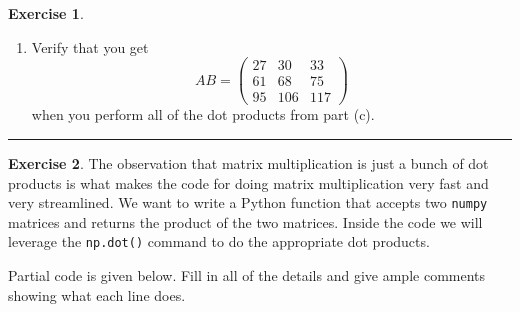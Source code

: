 \documentclass[
]{book}
\theoremstyle{definition}
\theoremstyle{definition}
\theoremstyle{definition}
\newtheorem{exercise}{Exercise}[chapter]
\theoremstyle{remark}
\begin{document}
\begin{exercise}
\begin{enumerate}
\[\begin{pmatrix}
  \underline{\hspace{0.25in}} \cdot \underline{\hspace{0.25in}} & \underline{\hspace{0.25in}} \cdot \underline{\hspace{0.25in}} & \underline{\hspace{0.25in}} \cdot \underline{\hspace{0.25in}} \\ \underline{\hspace{0.25in}} \cdot \underline{\hspace{0.25in}} & \underline{\hspace{0.25in}} \cdot \underline{\hspace{0.25in}} & \underline{\hspace{0.25in}} \cdot \underline{\hspace{0.25in}} \end{pmatrix} \]
\item
  Verify that you get
  \[ AB = \begin{pmatrix} 27 & 30 & 33 \\ 61 & 68 & 75 \\ 95 & 106 & 117 \end{pmatrix}\]
  when you perform all of the dot products from part (c).
\end{enumerate}
\end{exercise}

\begin{center}\rule{0.5\linewidth}{0.5pt}\end{center}

\begin{exercise}
\protect\hypertarget{exr:unnamed-chunk-302}{}{\label{exr:unnamed-chunk-302} }The observation that matrix multiplication is just a bunch of dot products is what makes the code for doing matrix multiplication very fast and very streamlined. We want to write a Python function that accepts two \texttt{numpy} matrices and returns the product of the two matrices. Inside the code we will leverage the \texttt{np.dot()} command to do the appropriate dot products.

Partial code is given below. Fill in all of the details and give ample comments showing what each line does.
\end{exercise}
\end{document}
